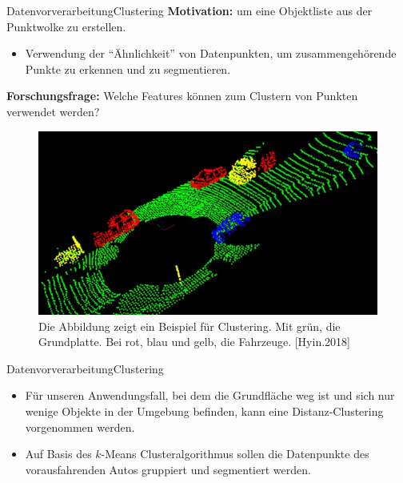 \documentclass[169, handout	]{THIbeamer} %
\begin{document}
	\begin{frame}{Datenvorverarbeitung}{Clustering}
		\small
		\textbf{Motivation:} um eine Objektliste aus der Punktwolke zu erstellen. 
		\begin{itemize}
			\item Verwendung der \enquote{Ähnlichkeit} von Datenpunkten, um zusammengehörende Punkte zu erkennen und zu segmentieren.
		\end{itemize}
		\textbf{Forschungsfrage:} Welche Features können zum Clustern von Punkten verwendet werden? 
		\begin{figure}
			\includegraphics[scale=0.37]{required/Clustering.jpg}
			\caption{Die Abbildung zeigt ein Beispiel für Clustering. Mit grün, die Grundplatte. Bei rot, blau und gelb, die Fahrzeuge. [Hyin.2018]}
        	\label{Clustering}
		\end{figure}
	\end{frame}
	\begin{frame}{Datenvorverarbeitung}{Clustering}
		\begin{itemize}
\item Für unseren Anwendungsfall, bei dem die Grundfläche weg ist und sich nur wenige Objekte in der Umgebung befinden, kann eine Distanz-Clustering vorgenommen werden.\\
\item Auf Basis des $k$-Means Clusteralgorithmus sollen die Datenpunkte des vorausfahrenden Autos gruppiert und segmentiert werden.
		\end{itemize}
	\end{frame}		
\end{document}

